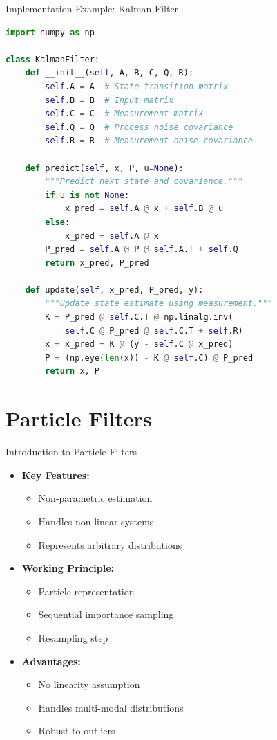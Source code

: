 \documentclass[aspectratio=169]{beamer}
\begin{document}
\begin{frame}[fragile]{Implementation Example: Kalman Filter}
\begin{lstlisting}[language=Python]
import numpy as np

class KalmanFilter:
    def __init__(self, A, B, C, Q, R):
        self.A = A  # State transition matrix
        self.B = B  # Input matrix
        self.C = C  # Measurement matrix
        self.Q = Q  # Process noise covariance
        self.R = R  # Measurement noise covariance
        
    def predict(self, x, P, u=None):
        """Predict next state and covariance."""
        if u is not None:
            x_pred = self.A @ x + self.B @ u
        else:
            x_pred = self.A @ x
        P_pred = self.A @ P @ self.A.T + self.Q
        return x_pred, P_pred
    
    def update(self, x_pred, P_pred, y):
        """Update state estimate using measurement."""
        K = P_pred @ self.C.T @ np.linalg.inv(
            self.C @ P_pred @ self.C.T + self.R)
        x = x_pred + K @ (y - self.C @ x_pred)
        P = (np.eye(len(x)) - K @ self.C) @ P_pred
        return x, P
\end{lstlisting}
\end{frame}

\section{Particle Filters}

\begin{frame}{Introduction to Particle Filters}
    \begin{itemize}
        \item<1-> \textbf{Key Features:}
            \begin{itemize}
                \item Non-parametric estimation
                \item Handles non-linear systems
                \item Represents arbitrary distributions
            \end{itemize}
        \item<2-> \textbf{Working Principle:}
            \begin{itemize}
                \item Particle representation
                \item Sequential importance sampling
                \item Resampling step
            \end{itemize}
        \item<3-> \textbf{Advantages:}
            \begin{itemize}
                \item No linearity assumption
                \item Handles multi-modal distributions
                \item Robust to outliers
            \end{itemize}
    \end{itemize}
\end{frame}
\end{document}
